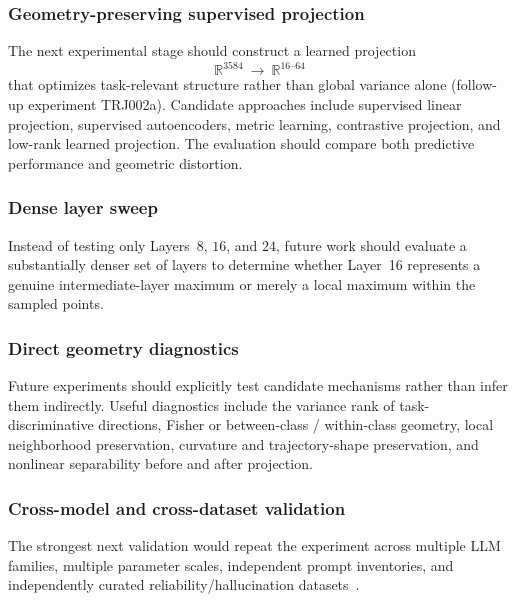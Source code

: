 \documentclass{article}
\begin{document}
\subsubsection{Geometry-preserving supervised projection}
The next experimental stage should construct a learned projection
\begin{equation}
  \mathbb{R}^{3584}\ \rightarrow\ \mathbb{R}^{16\text{--}64}
\end{equation}
that optimizes task-relevant structure rather than global variance alone (follow-up experiment {TRJ002a}).
Candidate approaches include supervised linear projection, supervised autoencoders, metric learning, contrastive projection, and low-rank learned projection.
The evaluation should compare both predictive performance and geometric distortion.

\subsubsection{Dense layer sweep}
Instead of testing only Layers~$8$, $16$, and $24$, future work should evaluate a substantially denser set of layers to determine whether Layer~16 represents a genuine intermediate-layer maximum or merely a local maximum within the sampled points.

\subsubsection{Direct geometry diagnostics}
Future experiments should explicitly test candidate mechanisms rather than infer them indirectly.
Useful diagnostics include the variance rank of task-discriminative directions, {Fisher} or between-class / within-class geometry, local neighborhood preservation, curvature and trajectory-shape preservation, and nonlinear separability before and after projection.

\subsubsection{Cross-model and cross-dataset validation}
The strongest next validation would repeat the experiment across multiple {LLM} families, multiple parameter scales, independent prompt inventories, and independently curated reliability/hallucination datasets~\citep{kuhn2023semantic,manakul2023selfcheck}.
\end{document}
